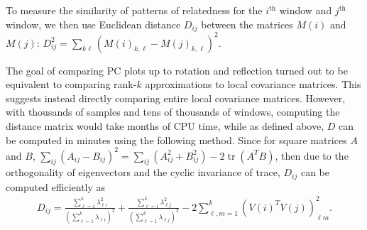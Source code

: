 \documentclass[11pt, oneside]{article}   	%
\DeclareMathOperator{\tr}{tr}
\begin{document}
To measure the similarity of patterns of relatedness for the $i^\text{th}$ window and $j^\text{th}$ window,
we then use
Euclidean distance $D_{ij}$ between the matrices $M(i)$ and $M(j)$:
$D_{ij}^2 = \sum_{k\ell} ( M(i)_{k,\ell} - M(j)_{k,\ell} )^2$.


The goal of comparing PC plots up to rotation and reflection 
turned out to be equivalent to comparing rank-$k$ approximations to local covariance matrices.
This suggests instead directly comparing entire local covariance matrices. 
However, with thousands of samples and tens of thousands of windows,
computing the distance matrix would take months of CPU time,
while as defined above, $D$ can be computed in minutes using the following method.
Since for square matrices $A$ and $B$,
$\sum_{ij} (A_{ij}-B_{ij})^2 = \sum_{ij} (A^2_{ij} + B^2_{ij}) - 2 \tr(A^T B)$,
then due to the orthogonality of eigenvectors and the cyclic invariance of trace,
$D_{ij}$ can be computed efficiently as
\begin{align}
    D_{ij} 
    = 
    \frac{ \sum_{\ell=1}^k \lambda_{\ell i}^2 }{ (\sum_{\ell=1}^k \lambda_{\ell i})^2 }
    + \frac{ \sum_{\ell=1}^k \lambda_{\ell j}^2 }{ (\sum_{\ell=1}^k \lambda_{\ell j})^2 }
    - 2 \sum_{\ell, m=1}^k (V(i)^T V(j))^2_{\ell m} .
\end{align}
\end{document}
